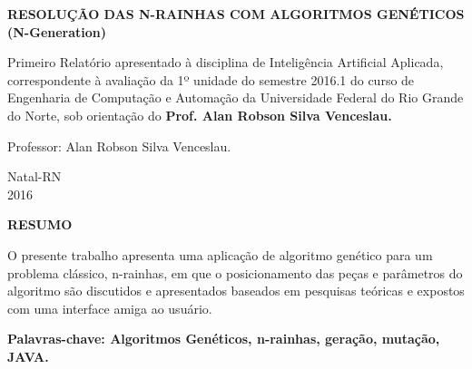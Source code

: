 \documentclass[12pt,a4paper]{article}
\begin{document}
{\bf{\large {\centering RESOLUÇÃO DAS N-RAINHAS COM ALGORITMOS GENÉTICOS (N-Generation)\\}}}

\vspace{4cm}

\begin{adjustwidth}{7.5cm}{0cm}

{\normalsize

Primeiro Relatório apresentado à disciplina de
Inteligência Artificial Aplicada, correspondente à
avaliação da 1º unidade do semestre 2016.1 do curso de 
Engenharia de Computação e Automação da Universidade 
Federal do Rio Grande do Norte, sob orientação do 
{\bf Prof. Alan Robson Silva Venceslau.}

}

\end{adjustwidth}

\vspace{2cm}

\begin{center}

Professor: Alan Robson Silva Venceslau.

\vspace{6cm}

{\large Natal-RN\\
2016}

\end{center}

\newpage
\thispagestyle{empty}

\begin{center}
{\large \textbf{RESUMO}}
\end{center}

\vspace{3cm}

\hspace{4ex}O presente trabalho apresenta uma aplicação de algoritmo genético para um problema clássico, n-rainhas, em que o posicionamento das peças e parâmetros do algoritmo são discutidos e apresentados baseados em pesquisas teóricas e expostos com uma interface amiga ao usuário.

\vspace{1.5cm}

\textbf{Palavras-chave: Algoritmos Genéticos, n-rainhas, geração, mutação, JAVA.}

%
%
%
\end{document}
